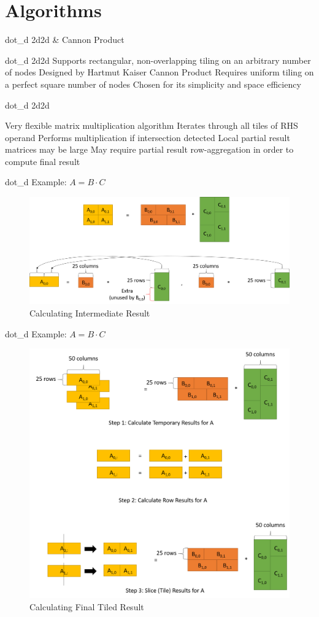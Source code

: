 \documentclass[10pt]{beamer}
\begin{document}
\section{Algorithms}

\begin{frame}{dot\_d 2d2d \& Cannon Product}
	\begin{outline}
		\1 dot\_d 2d2d
			\2 Supports rectangular, non-overlapping tiling on an arbitrary number of nodes
			\2 Designed by Hartmut Kaiser
		\1 Cannon Product
			\2 Requires uniform tiling on a perfect square number of nodes
			\2 Chosen for its simplicity and space efficiency
	\end{outline}
\end{frame}

\begin{frame}{dot\_d 2d2d}
\begin{outline}
	\1 Very flexible matrix multiplication algorithm
	\1 Iterates through all tiles of RHS operand
		\2 Performs multiplication if intersection detected
	\1 Local partial result matrices may be large
	\1 May require partial result row-aggregation in order to compute final result
\end{outline}
\end{frame}

\begin{frame}{dot\_d Example: $A = B \cdot C$}
	\begin{figure}	
		\centering
		\includegraphics[width=0.72\linewidth]{figures/intermediate_result.png}
		\caption{Calculating Intermediate Result}
	\end{figure}
\end{frame}

\begin{frame}{dot\_d Example: $A = B \cdot C$ }
	\begin{figure}	
		\centering
		\includegraphics[width=0.66\linewidth]{figures/intermediate_result_sum.png}
		\caption{Calculating Final Tiled Result}
	\end{figure}
\end{frame}
\end{document}
